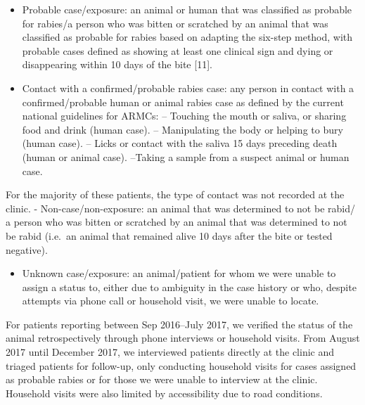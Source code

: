 \documentclass[
]{book}
\providecommand{\tightlist}{%
  \setlength{\itemsep}{0pt}\setlength{\parskip}{0pt}}
\begin{document}
\begin{itemize}
\item
  Probable case/exposure: an animal or human that was classified as probable for rabies/a person who was bitten or scratched by an animal that was classified as probable for rabies based on adapting the six-step method, with probable cases defined as showing at least one clinical sign and dying or disappearing within 10 days of the bite {[}11{]}.
\item
  Contact with a confirmed/probable rabies case: any person in contact with a confirmed/probable human or animal rabies case as defined by the current national guidelines for ARMCs: -- Touching the mouth or saliva, or sharing food and drink (human case). -- Manipulating the body or helping to bury (human case). -- Licks or contact with the saliva 15 days preceding death (human or animal case). --Taking a sample from a suspect animal or human case.
\end{itemize}

For the majority of these patients, the type of contact was not recorded at the clinic. - Non-case/non-exposure: an animal that was determined to not be rabid/ a person who was bitten or scratched by an animal that was determined to not be rabid (i.e.~an animal that remained alive 10 days after the bite or tested negative).

\begin{itemize}
\tightlist
\item
  Unknown case/exposure: an animal/patient for whom we were unable to assign a status to, either due to ambiguity in the case history or who, despite attempts via phone call or household visit, we were unable to locate.
\end{itemize}

For patients reporting between Sep 2016--July 2017, we verified the status of the animal retrospectively through phone interviews or household visits. From August 2017 until December 2017, we interviewed patients directly at the clinic and triaged patients for follow-up, only conducting household visits for cases assigned as probable rabies or for those we were unable to interview at the clinic. Household visits were also limited by accessibility due to road conditions.
\end{document}
